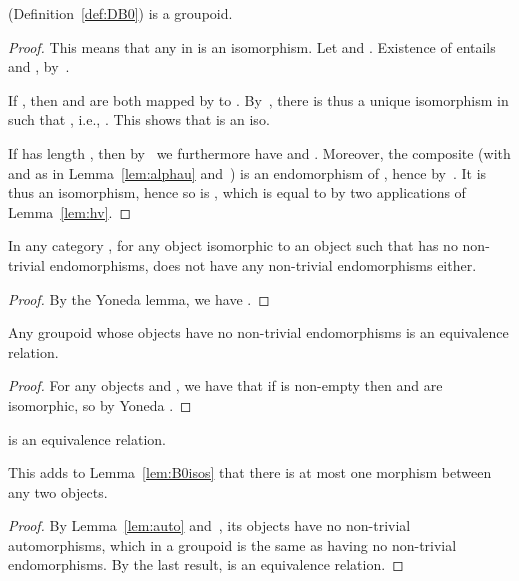 \documentclass{LMCS}
\theoremstyle{plain}\newtheorem{satz}[thm]{Satz}
\begin{document}
\begin{lem}\label{lem:B0isos}
   (Definition~\ref{def:DB0}) is a groupoid.
\end{lem}
\begin{proof}
  This means that any  in  is an
  isomorphism.  Let  and . Existence of  entails  and , by~.

  If , then  and  are both
  mapped by  to . By~, there is thus a unique
  isomorphism  in  such that , i.e., . This shows that
   is an iso.
  
  If  has length , then by~ we furthermore
  have  and . Moreover, the
  composite  (with
   and  as in Lemma~\ref{lem:alphau}
  and~) is an endomorphism of , hence
   by~.  It is thus an
  isomorphism, hence so is , which is equal to 
  by two applications of Lemma~\ref{lem:hv}.
\end{proof}

\begin{lem}\label{lem:auto}
  In any category , for any object  isomorphic to an object  such
  that  has no non-trivial endomorphisms,  does not have any
  non-trivial endomorphisms either.
\end{lem}
\begin{proof}
  By the Yoneda lemma, we have .
\end{proof}

\begin{lem}
   Any groupoid  whose objects have no non-trivial endomorphisms
   is an equivalence relation.
\end{lem}
\begin{proof}
  For any objects  and , we have that if  is non-empty
  then  and  are isomorphic, so by Yoneda .
\end{proof}

\begin{cor}\label{cor:B0eqrel}
 is an equivalence relation.  
\end{cor}
This adds to Lemma~\ref{lem:B0isos} that there is at most one morphism
between any two objects.
  \begin{proof}
    By Lemma~\ref{lem:auto} and~, its objects have no
    non-trivial automorphisms, which in a groupoid is the same as
    having no non-trivial endomorphisms. By the last result, 
    is an equivalence relation.
  \end{proof}
\end{document}
